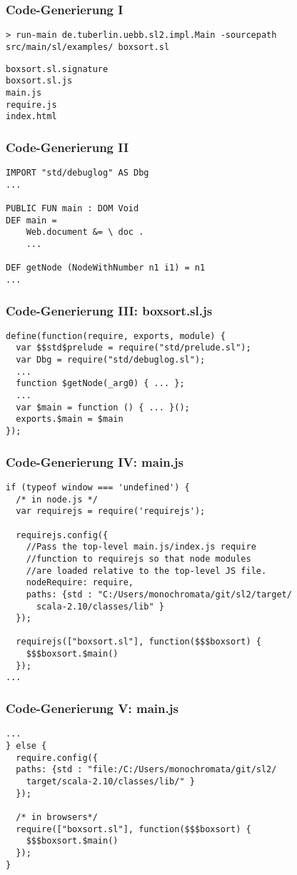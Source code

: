 \begin{frame}[containsverbatim=true]
\frametitle{Code-Generierung I}

\begin{verbatim}
> run-main de.tuberlin.uebb.sl2.impl.Main -sourcepath
src/main/sl/examples/ boxsort.sl
\end{verbatim}
        
\begin{verbatim}
boxsort.sl.signature
boxsort.sl.js
main.js
require.js
index.html
\end{verbatim}
\end{frame}

\begin{frame}[containsverbatim=true]
\frametitle{Code-Generierung II}
\begin{verbatim}
IMPORT "std/debuglog" AS Dbg
...

PUBLIC FUN main : DOM Void
DEF main = 
    Web.document &= \ doc .
    ...
    
DEF getNode (NodeWithNumber n1 i1) = n1
...
\end{verbatim}
\end{frame}

\begin{frame}[containsverbatim=true]
\frametitle{Code-Generierung III: boxsort.sl.js}
\begin{verbatim}
define(function(require, exports, module) {
  var $$std$prelude = require("std/prelude.sl");
  var Dbg = require("std/debuglog.sl");
  ...
  function $getNode(_arg0) { ... };
  ...
  var $main = function () { ... }();
  exports.$main = $main
});
\end{verbatim}
\end{frame}

\begin{frame}[containsverbatim=true]
\frametitle{Code-Generierung IV: main.js}
\begin{verbatim}
if (typeof window === 'undefined') {
  /* in node.js */
  var requirejs = require('requirejs');

  requirejs.config({
    //Pass the top-level main.js/index.js require
    //function to requirejs so that node modules
    //are loaded relative to the top-level JS file.
    nodeRequire: require,
    paths: {std : "C:/Users/monochromata/git/sl2/target/
      scala-2.10/classes/lib" }
  });

  requirejs(["boxsort.sl"], function($$$boxsort) {
    $$$boxsort.$main()
  });
...
\end{verbatim}
\end{frame}

\begin{frame}[containsverbatim=true]
\frametitle{Code-Generierung V: main.js}
\begin{verbatim}
...
} else {
  require.config({
  paths: {std : "file:/C:/Users/monochromata/git/sl2/
    target/scala-2.10/classes/lib/" }
  });

  /* in browsers*/ 
  require(["boxsort.sl"], function($$$boxsort) {
    $$$boxsort.$main()
  });
}
\end{verbatim}
\end{frame}